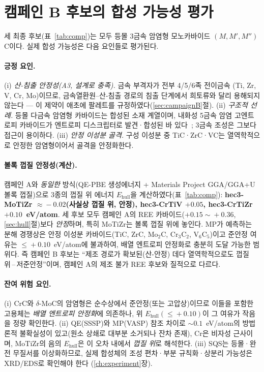 \documentclass[11pt,a4paper]{report}
\begin{document}
\section{캠페인 B 후보의 합성 가능성 평가}
\label{sec:synth-feasibility}
세 최종 후보(표~\ref{tab:comp})는 모두 등몰 3금속 암염형 모노카바이드 $(M,M',M'')$C이다. 실제 합성
가능성은 다음 요인들로 평가된다.

\paragraph{긍정 요인.} (i) \emph{산-침출 안정성(A3, 설계로 충족).} 금속 부격자가 전부 4/5/6족 전이금속
(Ti, Zr, V, Cr, Mo)이므로, 금속열환원--산-침출 경로의 침출 단계에서 희토류와 달리 용해되지 않는다
--- 이 제약이 애초에 팔레트를 규정하였다(\ref{sec:campaignB}절). (ii) \emph{구조적 선례.} 등몰 다금속
암염형 카바이드는 합성된 소재 계열이며, 내화성 5금속 암염 고엔트로피 카바이드가 엔트로피 디스크립터로
발견·합성된 바 있다~\cite{sarker2018}; 3금속 조성은 그보다 접근이 용이하다. (iii) \emph{안정 이성분
골격.} 구성 이성분 중 TiC·ZrC·VC는 열역학적으로 안정한 암염형이어서 골격을 안정화한다.

\paragraph{볼록 껍질 안정성(계산).} 캠페인 A와 \emph{동일한} 방식(QE-PBE 생성에너지 + Materials
Project GGA/GGA+U 볼록 껍질)으로 3종의 껍질 위 에너지 $E_{\mathrm{hull}}$을 계산하였다(표~\ref{tab:comp}):
\textbf{hec3-MoTiZr $\approx\!-0.02$(사실상 껍질 위, 안정), hec3-CrTiV $+0.05$, hec3-CrTiZr $+0.10$~eV/atom}.
세 후보 모두 캠페인 A의 REE 카바이드($+0.15\!\sim\!+0.36$, \ref{sec:hull}절)보다 \emph{안정}하며, 특히
MoTiZr는 볼록 껍질 위에 놓인다. MP가 예측하는 분해 경쟁상은 안정 이성분 카바이드(TiC, ZrC,
Mo$_2$C, Cr$_3$C$_2$, V$_6$C$_5$)이고 준안정 여유는 $\le\!+0.10$~eV/atom에 불과하여, 배열 엔트로피
안정화로 충분히 도달 가능한 범위다. 즉 캠페인 B 후보는 ``제조 경로가 확보된(산-안정) 데다 열역학적으로도
껍질 위\,--\,저준안정''이며, 캠페인 A의 제조 불가 REE 후보와 질적으로 다르다.

\paragraph{잔여 위험 요인.} (i) CrC와 $\delta$-MoC의 암염형은 순수상에서 준안정(또는 고압상)이므로
이들을 포함한 고용체는 \emph{배열 엔트로피 안정화}에 의존하나, 위 $E_{\mathrm{hull}}(\le\!+0.10)$이 그
여유가 작음을 정량 확인한다. (ii) QE(SSSP)와 MP(VASP) 참조 차이로 $\sim\!0.1$~eV/atom의 방법론적
불확실성이 있고(원소 상쇄로 대부분 소거되나 잔차 존재), Cr은 비자성 근사이며, MoTiZr의 음의
$E_{\mathrm{hull}}$은 이 오차 내에서 \emph{껍질 위}로 해석한다. (iii) SQS는 등몰·완전 무질서를
이상화하므로, 실제 합성체의 조성 편차·부분 규칙화·상분리 가능성은 XRD/EDS로 확인해야 한다
(\ref{ch:experiment}장).
\end{document}
